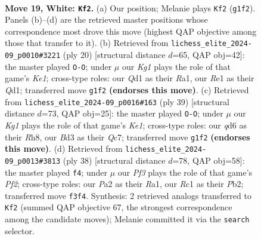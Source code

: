 \documentclass[11pt]{article}
\begin{document}
\begin{figure}[p]
\label{fig:thought-m34}
\end{figure}

\clearpage

\begin{figure}[p]\centering
\begin{subfigure}{0.46\textwidth}\centering
\resizebox{\linewidth}{!}{%
\newchessgame
\chessboard[
  setfen={r1b3k1/pp1n3p/2pq1rp1/3p2p1/3P4/2NBPPP1/PP5P/2RQR1K1 w - - 1 19},
  showmover=false,
  pgfstyle=straightmove, color=movearrow, markmove={g1-f2}
]}
\caption{}
\end{subfigure}\hfill
\begin{subfigure}{0.46\textwidth}\centering
\resizebox{\linewidth}{!}{%
\newchessgame
\chessboard[
  setfen={r1b1k2r/pp3ppp/2nqp3/3p4/3P4/2PBPN2/P4PPP/R2QK2R w KQkq - 0 11},
  showmover=false,
  pgfstyle=straightmove, color=movearrow, markmove={e1-g1}
]}
\caption{}
\end{subfigure}
\\[4pt]
\begin{subfigure}{0.46\textwidth}\centering
\resizebox{\linewidth}{!}{%
\newchessgame
\chessboard[
  setfen={2r1k2r/2qn1pp1/p2p4/1p1Pp1Pp/5b1P/1NPQ1P2/PP3B2/1K1R3R b k - 0 20},
  showmover=false,
  pgfstyle=straightmove, color=movearrow, markmove={e8-g8}
]}
\caption{}
\end{subfigure}\hfill
\begin{subfigure}{0.46\textwidth}\centering
\resizebox{\linewidth}{!}{%
\newchessgame
\chessboard[
  setfen={5r1k/pb4pp/1pnqpr2/2p5/2Pp3P/1N1P2P1/PP2QPB1/R3R1K1 w - - 4 20},
  showmover=false,
  pgfstyle=straightmove, color=movearrow, markmove={f2-f4}
]}
\caption{}
\end{subfigure}
\caption{\textbf{Move 19, White: \texttt{Kf2}.} (a) Our position; Melanie plays \texttt{Kf2} (\texttt{g1f2}). Panels (b)--(d) are the retrieved master positions whose correspondence most drove this move (highest QAP objective among those that transfer to it). (b) Retrieved from \texttt{lichess\_elite\_2024-09\_p0010\#3221} (ply 20) [structural distance $d$=65, QAP obj=42]: the master played \texttt{O-O}; under $\mu$ our \emph{Kg1} plays the role of that game's \emph{Ke1}; cross-type roles: our \emph{Q}d1 as their \emph{R}a1, our \emph{R}e1 as their \emph{Q}d1; transferred move \texttt{g1f2} \textbf{(endorses this move)}. (c) Retrieved from \texttt{lichess\_elite\_2024-09\_p0016\#163} (ply 39) [structural distance $d$=73, QAP obj=25]: the master played \texttt{O-O}; under $\mu$ our \emph{Kg1} plays the role of that game's \emph{Ke1}; cross-type roles: our \emph{q}d6 as their \emph{R}h8, our \emph{B}d3 as their \emph{Q}c7; transferred move \texttt{g1f2} \textbf{(endorses this move)}. (d) Retrieved from \texttt{lichess\_elite\_2024-09\_p0013\#3813} (ply 38) [structural distance $d$=78, QAP obj=58]: the master played \texttt{f4}; under $\mu$ our \emph{Pf3} plays the role of that game's \emph{Pf2}; cross-type roles: our \emph{P}a2 as their \emph{R}a1, our \emph{R}c1 as their \emph{P}b2; transferred move \texttt{f3f4}. Synthesis: 2 retrieved analogs transferred to \texttt{Kf2} (summed QAP objective 67, the strongest correspondence among the candidate moves); Melanie committed it via the \texttt{search} selector.}

\end{figure}
\end{document}
